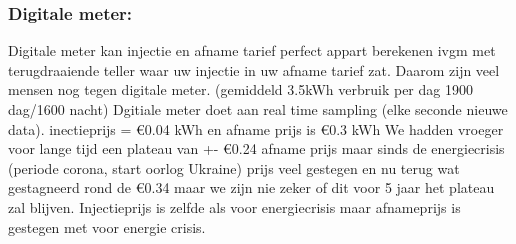 \documentclass[12pt]{article}
\begin{document}
\subsubsection{Digitale meter:}
Digitale meter kan injectie en afname tarief perfect appart berekenen ivgm met terugdraaiende teller waar uw injectie in uw afname tarief zat. Daarom zijn veel mensen nog tegen digitale meter. (gemiddeld 3.5kWh verbruik per dag 1900 dag/1600 nacht) Dgitiale meter doet aan real time sampling (elke seconde nieuwe data). inectieprijs = €0.04 kWh en afname prijs is €0.3 kWh
We hadden vroeger voor lange tijd een plateau van +- €0.24 afname prijs maar sinds de energiecrisis (periode corona, start oorlog Ukraine) prijs veel gestegen en nu terug wat gestagneerd rond de €0.34 maar we zijn nie zeker of dit voor 5 jaar het plateau zal blijven.
Injectieprijs is zelfde als voor energiecrisis maar afnameprijs is gestegen met voor energie crisis.
\end{document}
